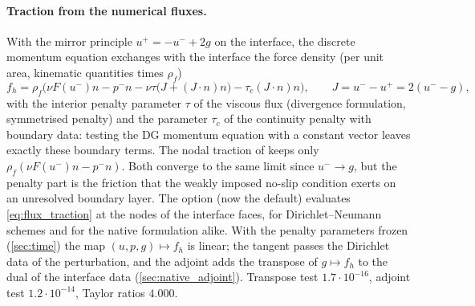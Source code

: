 \documentclass[11pt,a4paper]{article}
\theoremstyle{definition}
\theoremstyle{remark}
\begin{document}
\paragraph{Traction from the numerical fluxes.} With the mirror principle $u^+=-u^-+2g$ on the
interface, the discrete momentum equation exchanges with the interface the force density (per unit
area, kinematic quantities times $\rho_f$)
\begin{equation}\label{eq:flux_traction}
  f_h=\rho_f\Big(\nu F(u^-)n-p^-n-\nu\tau\big(J+(J\cdot n)n\big)-\tau_c(J\cdot n)n\Big),\qquad
  J=u^--u^+=2(u^--g),
\end{equation}
with the interior penalty parameter $\tau$ of the viscous flux (divergence formulation, symmetrised
penalty) and the parameter $\tau_c$ of the continuity penalty with boundary data: testing the DG
momentum equation with a constant vector leaves exactly these boundary terms. The nodal traction of
 keeps only $\rho_f(\nu F(u^-)n-p^-n)$. Both converge to the same limit
since $u^-\to g$, but the penalty part is the friction that the weakly imposed no-slip condition
exerts on an unresolved boundary layer. The option  (now the
default) evaluates
\eqref{eq:flux_traction} at the nodes of the interface faces, for Dirichlet--Neumann schemes and for
the native formulation alike. With the penalty parameters frozen (\cref{sec:time}) the map
$(u,p,g)\mapsto f_h$ is linear; the tangent passes the Dirichlet data of the perturbation, and the
adjoint adds the transpose of $g\mapsto f_h$ to the dual of the interface data
(\cref{sec:native_adjoint}). Transpose test $1.7\cdot10^{-16}$, adjoint test
$1.2\cdot10^{-14}$, Taylor ratios $4.000$.
\end{document}
